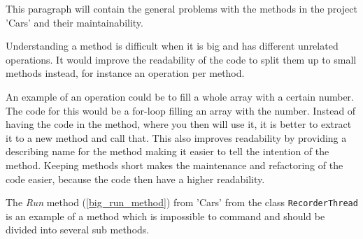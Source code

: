 This paragraph will contain the general problems with the methods in the project 'Cars' and their maintainability.

Understanding a method is difficult when it is big and has different unrelated operations.
It would improve the readability of the code to split them up to small methods instead, for instance an operation per method.

An example of an operation could be to fill a whole array with a certain number.
The code for this would be a for-loop filling an array with the number.
Instead of having the code in the method, where you then will use it, it is better to extract it to a new method and call that.
This also improves readability by providing a describing name for the method making it easier to tell the intention of the method.
Keeping methods short makes the maintenance and refactoring of the code easier, because the code then have a higher readability.

The \textit{Run} method (\cref{big_run_method}) from 'Cars' from the class \lstinline!RecorderThread! is an example of a method which is impossible to command and should be divided into several sub methods.